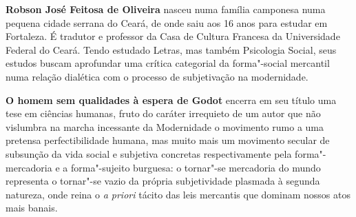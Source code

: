 
\textbf{Robson José Feitosa de Oliveira} nasceu numa família camponesa numa pequena cidade serrana do Ceará, de onde saiu aos 16 anos para estudar em Fortaleza. É tradutor e professor da Casa de Cultura Francesa da Universidade Federal do Ceará. Tendo estudado Letras, mas também Psicologia Social, seus estudos buscam aprofundar uma crítica categorial da forma"-social mercantil numa relação dialética com o processo de subjetivação na modernidade.


\textbf{O homem sem qualidades à espera de Godot} encerra em seu título uma tese em ciências humanas, fruto do caráter irrequieto de um autor que não vislumbra na marcha incessante da Modernidade o movimento rumo a uma pretensa perfectibilidade humana, mas muito mais um movimento secular de subsunção da vida social e subjetiva concretas respectivamente pela forma"-mercadoria e a forma"-sujeito burguesa: o tornar"-se mercadoria do mundo representa o tornar"-se vazio da própria subjetividade plasmada à segunda natureza, onde reina o \emph{a priori} tácito das leis mercantis que dominam nossos atos mais banais.

